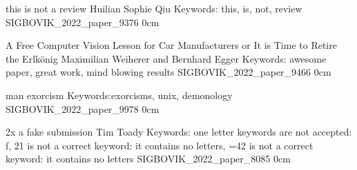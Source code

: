 \addpaper
    {this is not a review}
    {Huilian Sophie Qiu}
    {Keywords: this, is, not, review}
    {SIGBOVIK_2022_paper_9376}
    {0cm}
    {}

\addpaper
    {A Free Computer Vision Lesson for Car Manufacturers or It is Time to Retire the Erlkönig}
    {Maximilian Weiherer and Bernhard Egger}
    {Keywords: awesome paper, great work, mind blowing results}
    {SIGBOVIK_2022_paper_9466}
    {0cm}
    {}

\addpaper
    {man exorcism}
    {}
    {Keywords:exorcisms, unix, demonology}
    {SIGBOVIK_2022_paper_9978}
    {0cm}
    {}

\addpaper
    {2x a fake submission}
    {Tim Toady}
    {Keywords: one letter keywords are not accepted: f, 21 is not a correct keyword: it contains no letters, =42 is not a correct keyword: it contains no letters}
    {SIGBOVIK_2022_paper_8085}
    {0cm}
    {}


